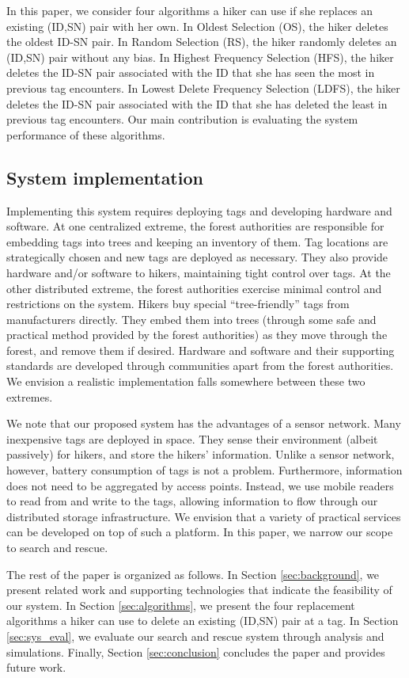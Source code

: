 \documentclass[conference]{IEEEtran}
\begin{document}
In this paper, we consider four algorithms a hiker can use if she replaces an existing (ID,SN) pair with her own.  In Oldest Selection (OS), the hiker deletes the oldest ID-SN pair.  In Random Selection (RS), the hiker randomly deletes an (ID,SN) pair without any bias.  In Highest Frequency Selection (HFS), the hiker deletes the ID-SN pair associated with the ID that she has seen the most in previous tag encounters.  In Lowest Delete Frequency Selection (LDFS), the hiker deletes the ID-SN pair associated with the ID that she has deleted the least in previous tag encounters.  Our main contribution is evaluating the system performance of these algorithms.

\subsection{System implementation}
Implementing this system requires deploying tags and developing hardware and software.  At one centralized extreme, the forest authorities are responsible for embedding tags into trees and keeping an inventory of them.  Tag locations are strategically chosen and new tags are deployed as necessary.  They also provide hardware and/or software to hikers, maintaining tight control over tags.  At the other distributed extreme, the forest authorities exercise minimal control and restrictions on the system.  Hikers buy special ``tree-friendly'' tags from manufacturers directly.  They embed them into trees (through some safe and practical method provided by the forest authorities) as they move through the forest, and remove them if desired.  Hardware and software and their supporting standards are developed through communities apart from the forest authorities.  We envision a realistic implementation falls somewhere between these two extremes. 

We note that our proposed system has the advantages of a sensor network.  Many inexpensive tags are deployed in space.  They sense their environment (albeit passively) for hikers, and store the hikers' information.  Unlike a sensor network, however, battery consumption of tags is not a problem.  Furthermore, information does not need to be aggregated by access points.  Instead, we use mobile readers to read from and write to the tags, allowing information to flow through our distributed storage infrastructure.  We envision that a variety of practical services can be developed on top of such a platform.  In this paper, we narrow our scope to search and rescue.

The rest of the paper is organized as follows.  In Section \ref{sec:background}, we present related work and supporting technologies that indicate the feasibility of our system.  In Section \ref{sec:algorithms}, we present the four replacement algorithms a hiker can use to delete an existing (ID,SN) pair at a tag.  In Section \ref{sec:sys_eval}, we evaluate our search and rescue system through analysis and simulations.  Finally, Section \ref{sec:conclusion} concludes the paper and provides future work.
\end{document}
